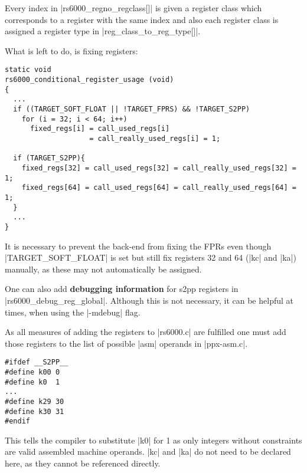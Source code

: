 Every index in |rs6000_regno_regclass[]| is given a register class which corresponds to a register with the same index and also each register class is assigned a register type in |reg_class_to_reg_type[]|.

What is left to do, is fixing registers:
\begin{lstlisting}
static void
rs6000_conditional_register_usage (void)
{
  ...
  if ((TARGET_SOFT_FLOAT || !TARGET_FPRS) && !TARGET_S2PP)
    for (i = 32; i < 64; i++)
      fixed_regs[i] = call_used_regs[i]
                    = call_really_used_regs[i] = 1;

  if (TARGET_S2PP){
    fixed_regs[32] = call_used_regs[32] = call_really_used_regs[32] = 1;
    fixed_regs[64] = call_used_regs[64] = call_really_used_regs[64] = 1;
  }
  ...
}
\end{lstlisting}
It is necessary to prevent the back-end from fixing the \acp{FPR} even though |TARGET_SOFT_FLOAT| is set but still fix registers 32 and 64 (|kc| and |ka|) manually, as these may not automatically be assigned.

One can also add \textbf{debugging information} for s2pp registers in |rs6000_debug_reg_global|.
Although this is not necessary, it can be helpful at times, when using the |-mdebug| flag.

As all measures of adding the registers to |rs6000.c| are fulfilled one must add those registers to the list of possible |asm| operands in |ppx-asm.c|.
\begin{lstlisting}
#ifdef __S2PP__
#define k00 0
#define k0  1
...
#define k29 30
#define k30 31
#endif
\end{lstlisting}
This tells the compiler to substitute |k0| for 1 as only integers without constraints are valid assembled machine operands.
|kc| and |ka| do not need to be declared here, as they cannot be referenced directly.

